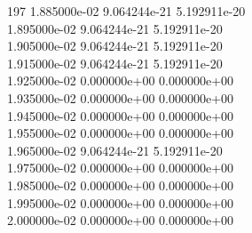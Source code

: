 197	1.885000e-02	9.064244e-21	5.192911e-20	\\ 	1.895000e-02	9.064244e-21	5.192911e-20	\\ 	1.905000e-02	9.064244e-21	5.192911e-20	\\ 	1.915000e-02	9.064244e-21	5.192911e-20	\\ 	1.925000e-02	0.000000e+00	0.000000e+00	\\ 	1.935000e-02	0.000000e+00	0.000000e+00	\\ 	1.945000e-02	0.000000e+00	0.000000e+00	\\ 	1.955000e-02	0.000000e+00	0.000000e+00	\\ 	1.965000e-02	9.064244e-21	5.192911e-20	\\ 	1.975000e-02	0.000000e+00	0.000000e+00	\\ 	1.985000e-02	0.000000e+00	0.000000e+00	\\ 	1.995000e-02	0.000000e+00	0.000000e+00	\\ 	2.000000e-02	0.000000e+00	0.000000e+00	\\ \hline
